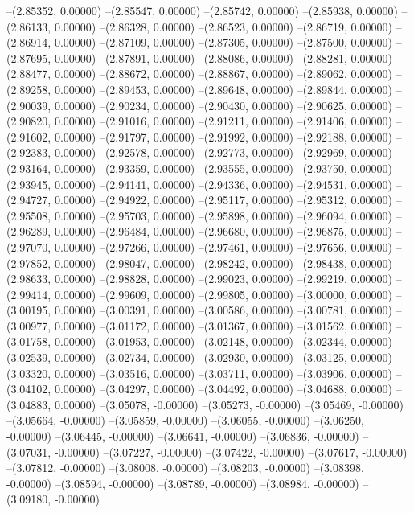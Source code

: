 --(2.85352, 0.00000)
--(2.85547, 0.00000)
--(2.85742, 0.00000)
--(2.85938, 0.00000)
--(2.86133, 0.00000)
--(2.86328, 0.00000)
--(2.86523, 0.00000)
--(2.86719, 0.00000)
--(2.86914, 0.00000)
--(2.87109, 0.00000)
--(2.87305, 0.00000)
--(2.87500, 0.00000)
--(2.87695, 0.00000)
--(2.87891, 0.00000)
--(2.88086, 0.00000)
--(2.88281, 0.00000)
--(2.88477, 0.00000)
--(2.88672, 0.00000)
--(2.88867, 0.00000)
--(2.89062, 0.00000)
--(2.89258, 0.00000)
--(2.89453, 0.00000)
--(2.89648, 0.00000)
--(2.89844, 0.00000)
--(2.90039, 0.00000)
--(2.90234, 0.00000)
--(2.90430, 0.00000)
--(2.90625, 0.00000)
--(2.90820, 0.00000)
--(2.91016, 0.00000)
--(2.91211, 0.00000)
--(2.91406, 0.00000)
--(2.91602, 0.00000)
--(2.91797, 0.00000)
--(2.91992, 0.00000)
--(2.92188, 0.00000)
--(2.92383, 0.00000)
--(2.92578, 0.00000)
--(2.92773, 0.00000)
--(2.92969, 0.00000)
--(2.93164, 0.00000)
--(2.93359, 0.00000)
--(2.93555, 0.00000)
--(2.93750, 0.00000)
--(2.93945, 0.00000)
--(2.94141, 0.00000)
--(2.94336, 0.00000)
--(2.94531, 0.00000)
--(2.94727, 0.00000)
--(2.94922, 0.00000)
--(2.95117, 0.00000)
--(2.95312, 0.00000)
--(2.95508, 0.00000)
--(2.95703, 0.00000)
--(2.95898, 0.00000)
--(2.96094, 0.00000)
--(2.96289, 0.00000)
--(2.96484, 0.00000)
--(2.96680, 0.00000)
--(2.96875, 0.00000)
--(2.97070, 0.00000)
--(2.97266, 0.00000)
--(2.97461, 0.00000)
--(2.97656, 0.00000)
--(2.97852, 0.00000)
--(2.98047, 0.00000)
--(2.98242, 0.00000)
--(2.98438, 0.00000)
--(2.98633, 0.00000)
--(2.98828, 0.00000)
--(2.99023, 0.00000)
--(2.99219, 0.00000)
--(2.99414, 0.00000)
--(2.99609, 0.00000)
--(2.99805, 0.00000)
--(3.00000, 0.00000)
--(3.00195, 0.00000)
--(3.00391, 0.00000)
--(3.00586, 0.00000)
--(3.00781, 0.00000)
--(3.00977, 0.00000)
--(3.01172, 0.00000)
--(3.01367, 0.00000)
--(3.01562, 0.00000)
--(3.01758, 0.00000)
--(3.01953, 0.00000)
--(3.02148, 0.00000)
--(3.02344, 0.00000)
--(3.02539, 0.00000)
--(3.02734, 0.00000)
--(3.02930, 0.00000)
--(3.03125, 0.00000)
--(3.03320, 0.00000)
--(3.03516, 0.00000)
--(3.03711, 0.00000)
--(3.03906, 0.00000)
--(3.04102, 0.00000)
--(3.04297, 0.00000)
--(3.04492, 0.00000)
--(3.04688, 0.00000)
--(3.04883, 0.00000)
--(3.05078, -0.00000)
--(3.05273, -0.00000)
--(3.05469, -0.00000)
--(3.05664, -0.00000)
--(3.05859, -0.00000)
--(3.06055, -0.00000)
--(3.06250, -0.00000)
--(3.06445, -0.00000)
--(3.06641, -0.00000)
--(3.06836, -0.00000)
--(3.07031, -0.00000)
--(3.07227, -0.00000)
--(3.07422, -0.00000)
--(3.07617, -0.00000)
--(3.07812, -0.00000)
--(3.08008, -0.00000)
--(3.08203, -0.00000)
--(3.08398, -0.00000)
--(3.08594, -0.00000)
--(3.08789, -0.00000)
--(3.08984, -0.00000)
--(3.09180, -0.00000)
